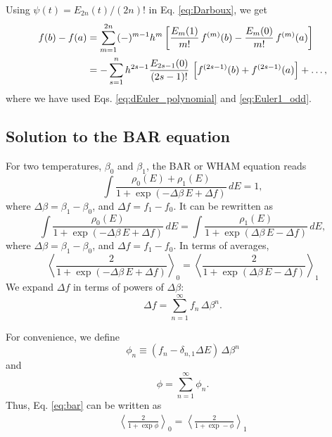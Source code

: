 \documentclass[aip,jcp,preprint,notitlepage, superscriptaddress]{revtex4-1}
\begin{document}
Using $\psi(t) = E_{2n}(t)/(2n)!$ in Eq. \eqref{eq:Darboux},
we get
\begin{align}
f(b) - f(a)
&=
\sum_{m = 1}^{2n}
  (-)^{m - 1} h^m
  \left[
    \frac{ E_m(1) } {m!} \, f^{(m)}(b)
    -
    \frac{ E_m(0) } {m!} \, f^{(m)}(a)
  \right]
\notag \\
&=
-\sum_{s = 1}^{n}
h^{2 s - 1}
\frac{ E_{2 s - 1}(0) }{ (2 s - 1)! }
    \, \left[f^{(2 s - 1)}(b) + f^{(2 s - 1)}(a)\right]
  + \dots,
\label{eq:Darboux_Euler}
\end{align}
where we have used
Eqs. \eqref{eq:dEuler_polynomial} and \eqref{eq:Euler1_odd}.
%



\subsection{Solution to the BAR equation}



For two temperatures, $\beta_0$ and $\beta_1$,
the BAR or WHAM equation reads
%
\begin{equation*}
\int
  \frac{ \rho_0(E) + \rho_1(E) }
  { 1 + \exp( -\Delta \beta \, E + \Delta f ) }
  \, d E
= 1,
\end{equation*}
%
where $\Delta \beta = \beta_1 - \beta_0$,
and
$\Delta f = f_1 - f_0$.
%
It can be rewritten as
%
\begin{equation*}
\int
  \frac{ \rho_0(E) }
  { 1 + \exp( -\Delta \beta \, E + \Delta f ) }
  \, d E
=
\int
  \frac{ \rho_1(E) }
  { 1 + \exp( \Delta \beta \, E - \Delta f ) }
  \, d E,
\end{equation*}
%
where
$\Delta \beta = \beta_1 - \beta_0$,
and
$\Delta f = f_1 - f_0$.
%
In terms of averages,
\begin{equation}
\left\langle
  \frac{ 2 }
  { 1 + \exp( -\Delta \beta \, E + \Delta f ) }
\right\rangle_0
=
\left\langle
  \frac{ 2 }
  { 1 + \exp( \Delta \beta \, E - \Delta f ) }
\right\rangle_1
\label{eq:bar}
\end{equation}
%
We expand $\Delta f$ in terms of powers of $\Delta \beta$:
\[
\Delta f
=
\sum_{n = 1}^\infty f_n \, \Delta \beta^n.
\]



For convenience,
we define
\[
\phi_n \equiv (f_n - \delta_{n,1} \Delta E) \, \Delta \beta^n
\]
and
\[
\phi = \sum_{n = 1}^\infty \phi_n.
\]
Thus, Eq. \eqref{eq:bar} can be written as
\begin{align*}
\left\langle
  \frac{ 2 }
  { 1 + \exp \phi  }
\right\rangle_0
=
\left\langle
  \frac{ 2 }
  { 1 + \exp -\phi }
\right\rangle_1
\label{eq:bar1}
\end{align*}
\end{document}
